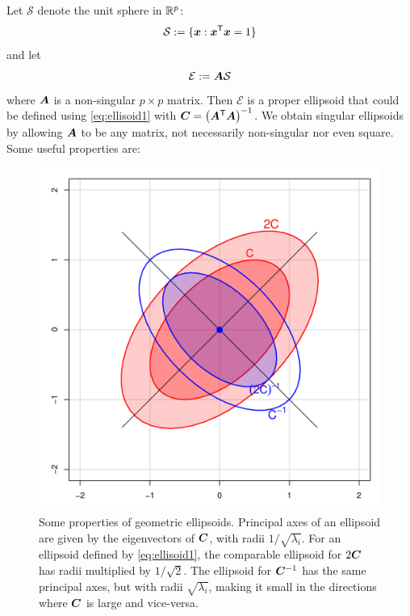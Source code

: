 Let $\mathcal{S}$ denote the unit sphere in  $\mathbb{R}^{p}$:
\begin{equation}
\mathcal{S} := \{ \bm{x}: \bm{x}^\mathsf{T}\bm{x} =1 \}
\end{equation}
and let 
\begin{equation}\label{eq:ellisoidsph}
\mathcal{E} := \bm{A} \mathcal{S}
\end{equation}
where $\bm{A}$ is a non-singular $p \times p$ matrix. Then $\mathcal{E}$ is a proper ellipsoid that could be defined using \eqref{eq:ellisoid1} with $\bm{C} = \left( \bm{A} ^\mathsf{T} \bm{A} \right)^{-1}$.
We obtain singular ellipsoids by allowing $\bm{A}$ to be any matrix, not necessarily non-singular nor even square. 
Some useful properties are:
\begin{figure}[tb]
  \centering
  \includegraphics[width=.5\textwidth,clip]{fig/inverse}
  \caption{Some properties of geometric ellipsoids. Principal axes of an ellipsoid are given by the eigenvectors of
  $\bm{C}$, with radii $1/\sqrt{\lambda_i}$.  For an ellipsoid defined by \eqref{eq:ellisoid1},
  the comparable ellipsoid for $2\bm{C}$ has radii multiplied by $1/\sqrt{2}$.
  The ellipsoid for $\bm{C}^{-1}$ has the same principal axes, but with radii $\sqrt{\lambda_i}$, making it
  small in the directions where $\bm{C}$ is large and vice-versa.
  } \label{fig:inverse}
\end{figure}

